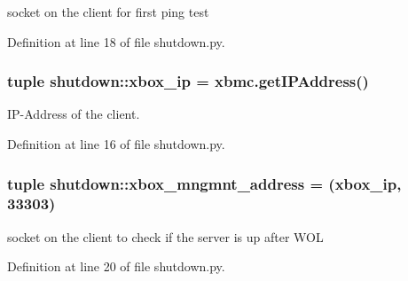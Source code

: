 socket on the client for first ping test 



Definition at line 18 of file shutdown.py.

\hypertarget{namespaceshutdown_a46841de53247fce3f5dcbf4ab5ecdfcc}{
\subsubsection[{xbox\_\-ip}]{\setlength{\rightskip}{0pt plus 5cm}tuple {\bf shutdown::xbox\_\-ip} = xbmc.getIPAddress()}}
\label{namespaceshutdown_a46841de53247fce3f5dcbf4ab5ecdfcc}


IP-\/Address of the client. 



Definition at line 16 of file shutdown.py.

\hypertarget{namespaceshutdown_aeda75aa721a3e99f8bd5667fed135478}{
\subsubsection[{xbox\_\-mngmnt\_\-address}]{\setlength{\rightskip}{0pt plus 5cm}tuple {\bf shutdown::xbox\_\-mngmnt\_\-address} = ({\bf xbox\_\-ip}, 33303)}}
\label{namespaceshutdown_aeda75aa721a3e99f8bd5667fed135478}


socket on the client to check if the server is up after WOL 



Definition at line 20 of file shutdown.py.

